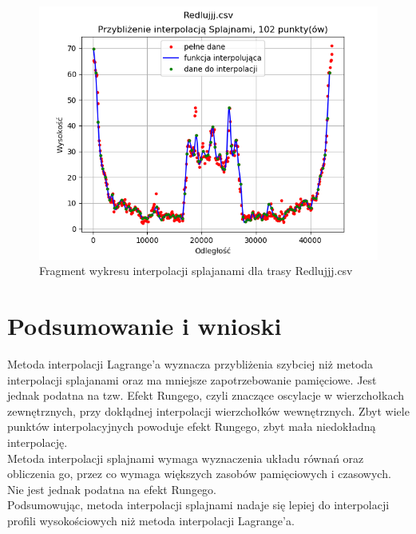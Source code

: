 \documentclass{article} %
\begin{document}
\begin{figure}[h!]
\begin{minipage}[b]{0.4\textwidth}
        \includegraphics[width=\textwidth]{splajny/rozne_trasy/redl_102.png}
        \caption{Fragment wykresu interpolacji splajanami dla trasy Redlujjj.csv}
    \end{minipage}
\end{figure}

\section{Podsumowanie i wnioski}
Metoda interpolacji Lagrange'a wyznacza przybliżenia szybciej niż metoda 
interpolacji splajanami oraz ma mniejsze zapotrzebowanie pamięciowe. Jest jednak podatna 
na tzw. Efekt Rungego, czyli znaczące oscylacje w wierzchołkach zewnętrznych, przy dokłądnej
interpolacji wierzchołków wewnętrznych. Zbyt wiele punktów interpolacyjnych powoduje efekt Rungego, 
zbyt mała niedokładną interpolację. \\
Metoda interpolacji splajnami wymaga wyznaczenia układu równań oraz obliczenia go, przez co 
wymaga większych zasobów pamięciowych i czasowych. Nie jest jednak podatna na efekt Rungego. \\
Podsumowując, metoda interpolacji splajnami nadaje się lepiej do interpolacji profili 
wysokościowych niż metoda interpolacji Lagrange'a.
\end{document}
